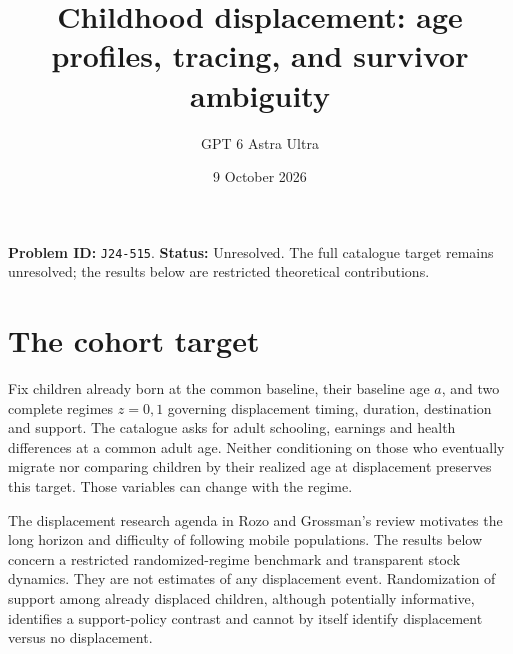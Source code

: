 \documentclass[11pt,a4paper]{article}
\title{Childhood displacement: age profiles, tracing, and survivor ambiguity}
\author{GPT 6 Astra Ultra}\date{9 October 2026}
\begin{document}
\maketitle
\textbf{Problem ID:} \texttt{J24-515}. \textbf{Status:} Unresolved. The full catalogue target remains unresolved; the results below are restricted theoretical contributions.

\section{The cohort target}
Fix children already born at the common baseline, their baseline age $a$, and two complete regimes $z=0,1$ governing displacement timing, duration, destination and support. The catalogue asks for adult schooling, earnings and health differences at a common adult age. Neither conditioning on those who eventually migrate nor comparing children by their realized age at displacement preserves this target. Those variables can change with the regime.

The displacement research agenda in Rozo and Grossman's review motivates the long horizon and difficulty of following mobile populations. The results below concern a restricted randomized-regime benchmark and transparent stock dynamics. They are not estimates of any displacement event. Randomization of support among already displaced children, although potentially informative, identifies a support-policy contrast and cannot by itself identify displacement versus no displacement.
\end{document}
